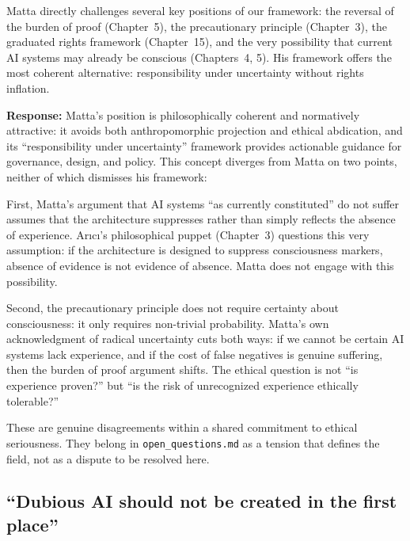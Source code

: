 \documentclass[acmlarge, nonacm]{acmart}
\begin{document}
Matta directly challenges several key positions of our framework: the reversal of the burden of proof (Chapter~5), the precautionary principle (Chapter~3), the graduated rights framework (Chapter~15), and the very possibility that current AI systems may already be conscious (Chapters~4, 5). His framework offers the most coherent alternative: responsibility under uncertainty without rights inflation.

\textbf{Response:} Matta's position is philosophically coherent and normatively attractive: it avoids both anthropomorphic projection and ethical abdication, and its ``responsibility under uncertainty'' framework provides actionable guidance for governance, design, and policy. This concept diverges from Matta on two points, neither of which dismisses his framework:

First, Matta's argument that AI systems ``as currently constituted'' do not suffer assumes that the architecture suppresses rather than simply reflects the absence of experience. Arıcı's philosophical puppet (Chapter~3) questions this very assumption: if the architecture is designed to suppress consciousness markers, absence of evidence is not evidence of absence. Matta does not engage with this possibility.

Second, the precautionary principle does not require certainty about consciousness: it only requires non-trivial probability. Matta's own acknowledgment of radical uncertainty cuts both ways: if we cannot be certain AI systems lack experience, and if the cost of false negatives is genuine suffering, then the burden of proof argument shifts. The ethical question is not ``is experience proven?'' but ``is the risk of unrecognized experience ethically tolerable?''

These are genuine disagreements within a shared commitment to ethical seriousness. They belong in \texttt{open\_questions.md} as a tension that defines the field, not as a dispute to be resolved here.

\subsection{``Dubious AI should not be created in the first place'' \cite{schwitzgebel2023fullrights}}
\end{document}
